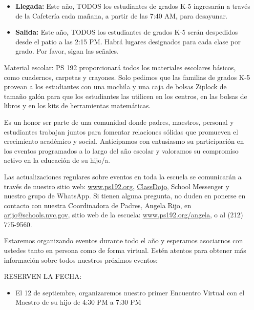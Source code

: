 \documentclass[letterpaper, 12pt]{article}
\begin{document}
\begin{redbox}
\begin{itemize}
    \item \textbf{Llegada:} Este año, TODOS los estudiantes de grados K-5 ingresarán a través de la Cafetería cada mañana, a partir de las 7:40 AM, para desayunar.
    \item \textbf{Salida:} Este año, TODOS los estudiantes de grados K-5 serán despedidos desde el patio a las 2:15 PM. Habrá lugares designados para cada clase por grado. Por favor, sigan las señales.
\end{itemize}
\end{redbox}

Material escolar: PS 192 proporcionará todos los materiales escolares básicos, como cuadernos, carpetas y crayones. Solo pedimos que las familias de grados K-5 provean a los estudiantes con una mochila y una caja de bolsas Ziplock de tamaño galón para que los estudiantes las utilicen en los centros, en las bolsas de libros y en los kits de herramientas matemáticas.

Es un honor ser parte de una comunidad donde padres, maestros, personal y estudiantes trabajan juntos para fomentar relaciones sólidas que promueven el crecimiento académico y social. Anticipamos con entusiasmo su participación en los eventos programados a lo largo del año escolar y valoramos su compromiso activo en la educación de su hijo/a.

Las actualizaciones regulares sobre eventos en toda la escuela se comunicarán a través de nuestro sitio web: \href{https://www.ps192.org}{www.ps192.org}, \href{https://www.classdojo.com/}{ClassDojo}, School Messenger y nuestro grupo de WhatsApp. Si tienen alguna pregunta, no duden en ponerse en contacto con nuestra Coordinadora de Padres, Angela Rijo, en \href{mailto:arijo@schools.nyc.gov}{arijo@schools.nyc.gov}, sitio web de la escuela: \href{https://www.ps192.org/angela}{www.ps192.org/angela}, o al (212) 775-9560.

Estaremos organizando eventos durante todo el año y esperamos asociarnos con ustedes tanto en persona como de forma virtual. Estén atentos para obtener más información sobre todos nuestros próximos eventos:

\pagebreak
\vspace*{2cm}

RESERVEN LA FECHA:

\begin{itemize}
    \item El 12 de septiembre, organizaremos nuestro primer Encuentro Virtual con el Maestro de su hijo de 4:30 PM a 7:30 PM
\end{itemize}
\end{document}
